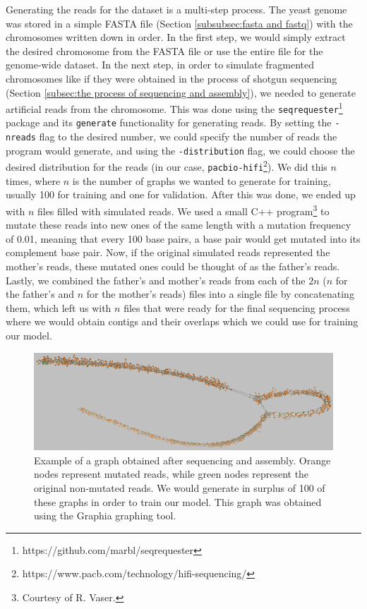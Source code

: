 \documentclass[times, utf8, diplomski, english]{fer_eng}
\begin{document}
Generating the reads for the dataset is a multi-step process. The yeast genome was stored in a simple FASTA file (Section \ref{subsubsec:fasta and fastq}) with the chromosomes written down in order. In the first step, we would simply extract the desired chromosome from the FASTA file or use the entire file for the genome-wide dataset. In the next step, in order to simulate fragmented chromosomes like if they were obtained in the process of shotgun sequencing (Section \ref{subsec:the process of sequencing and assembly}), we needed to generate artificial reads from the chromosome. This was done using the \texttt{seqrequester}\footnote{https://github.com/marbl/seqrequester} package and its \texttt{generate} functionality for generating reads. By setting the \texttt{-nreads} flag to the desired number, we could specify the number of reads the program would generate, and using the \texttt{-distribution} flag, we could choose the desired distribution for the reads (in our case, \texttt{pacbio-hifi}\footnote{https://www.pacb.com/technology/hifi-sequencing/}). We did this $n$ times, where $n$ is the number of graphs we wanted to generate for training, usually 100 for training and one for validation. After this was done, we ended up with $n$ files filled with simulated reads. We used a small C++ program\footnote{Courtesy of R. Vaser.} to mutate these reads into new ones of the same length with a mutation frequency of 0.01, meaning that every 100 base pairs, a base pair would get mutated into its complement base pair. Now, if the original simulated reads represented the mother's reads, these mutated ones could be thought of as the father's reads. Lastly, we combined the father's and mother's reads from each of the $2n$ ($n$ for the father's and $n$ for the mother's reads) files into a single file by concatenating them, which left us with $n$ files that were ready for the final sequencing process where we would obtain contigs and their overlaps which we could use for training our model.

\begin{figure}[h]
	\centering
	\includegraphics[width=\textwidth]{images/graph_example.png}
	\caption[Graph]{Example of a graph obtained after sequencing and assembly. Orange nodes represent mutated reads, while green nodes represent the original non-mutated reads. We would generate in surplus of 100 of these graphs in order to train our model. This graph was obtained using the Graphia\footnotemark{} graphing tool.}
	\label{fig:graph}
\end{figure}
\end{document}

